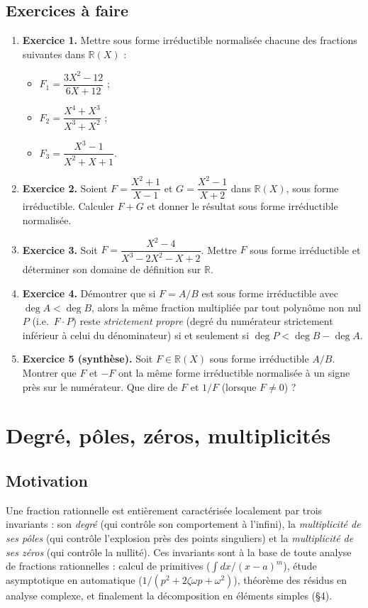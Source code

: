 \subsection{Exercices à faire}
\begin{enumerate}
    \item \textbf{Exercice 1.} Mettre sous forme irréductible normalisée chacune des fractions suivantes dans $\mathbb{R}(X)$ :
    \begin{itemize}
        \item $F_1 = \dfrac{3X^2 - 12}{6X + 12}$ ;
        \item $F_2 = \dfrac{X^4 + X^3}{X^3 + X^2}$ ;
        \item $F_3 = \dfrac{X^3 - 1}{X^2 + X + 1}$.
    \end{itemize}
    \item \textbf{Exercice 2.} Soient $F = \dfrac{X^2 + 1}{X - 1}$ et $G = \dfrac{X^2 - 1}{X + 2}$ dans $\mathbb{R}(X)$, sous forme irréductible. Calculer $F + G$ et donner le résultat sous forme irréductible normalisée.
    \item \textbf{Exercice 3.} Soit $F = \dfrac{X^2 - 4}{X^3 - 2X^2 - X + 2}$. Mettre $F$ sous forme irréductible et déterminer son domaine de définition sur $\mathbb{R}$.
    \item \textbf{Exercice 4.} Démontrer que si $F = A/B$ est sous forme irréductible avec $\deg A < \deg B$, alors la même fraction multipliée par tout polynôme non nul $P$ (i.e.\ $F \cdot P$) reste \emph{strictement propre} (degré du numérateur strictement inférieur à celui du dénominateur) si et seulement si $\deg P < \deg B - \deg A$.
    \item \textbf{Exercice 5 (synthèse).} Soit $F \in \mathbb{R}(X)$ sous forme irréductible $A/B$. Montrer que $F$ et $-F$ ont la même forme irréductible normalisée à un signe près sur le numérateur. Que dire de $F$ et $1/F$ (lorsque $F \neq 0$) ?
\end{enumerate}

\section{Degré, pôles, zéros, multiplicités}

\subsection{Motivation}
Une fraction rationnelle est entièrement caractérisée localement par trois invariants : son \emph{degré} (qui contrôle son comportement à l'infini), la \emph{multiplicité de ses pôles} (qui contrôle l'explosion près des points singuliers) et la \emph{multiplicité de ses zéros} (qui contrôle la nullité). Ces invariants sont à la base de toute analyse de fractions rationnelles : calcul de primitives ($\int dx/(x-a)^m$), étude asymptotique en automatique ($1/(p^2 + 2\zeta\omega p + \omega^2)$), théorème des résidus en analyse complexe, et finalement la décomposition en éléments simples (§4).

